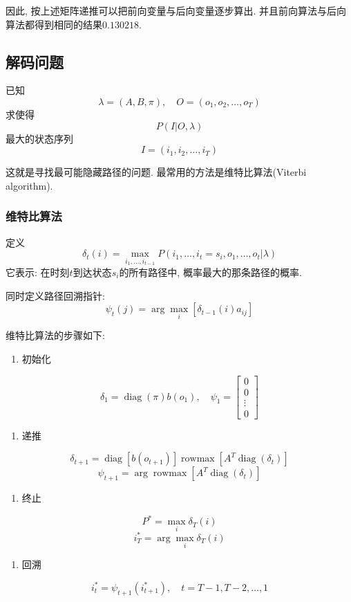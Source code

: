 因此, 按上述矩阵递推可以把前向变量与后向变量逐步算出.
并且前向算法与后向算法都得到相同的结果$0.130218$.

\subsection{解码问题}


已知
\[
\lambda = (A, B, \pi), \quad O = (o_1, o_2, \dots, o_T)
\]
求使得
\[
P(I | O, \lambda)
\]
最大的状态序列
\[
I = (i_1, i_2, \dots, i_T)
\]

这就是寻找最可能隐藏路径的问题.
最常用的方法是维特比算法(Viterbi algorithm).

\subsubsection{维特比算法}


定义
\[
\delta_t (i) = \max_{i_1, \dots, i_{t-1}} P(i_1, \dots, i_t = s_i, o_1, \dots, o_t | \lambda)
\]
它表示: 在时刻$t$到达状态$s_i$的所有路径中, 概率最大的那条路径的概率.

同时定义路径回溯指针:
\[
\psi_t(j) = \arg \max_i [\delta_{t-1}(i) a_{i j}]
\]

维特比算法的步骤如下:

\begin{enumerate}
\item[1.] 初始化
\end{enumerate}
\[
\delta_1 = \operatorname{diag}(\pi) b(o_1), \quad \psi_1 = \begin{bmatrix}0 \\ 0 \\ \vdots \\ 0\end{bmatrix}
\]

\begin{enumerate}
\item[2.] 递推
\end{enumerate}
\[
\delta_{t+1} = \operatorname{diag}[b(o_{t+1})]\operatorname{rowmax} [A^T \operatorname{diag}(\delta_t)]
\]
\[
\psi_{t+1} = \arg \operatorname{rowmax} [A^T \operatorname{diag}(\delta_t)]
\]

\begin{enumerate}
\item[3.] 终止
\end{enumerate}
\[
P^* = \max_i \delta_T (i)
\]
\[
i_T^* = \arg \max_i \delta_T (i)
\]

\begin{enumerate}
\item[4.] 回溯
\end{enumerate}
\[
i_t^* = \psi_{t+1}(i_{t+1}^*), \quad t = T-1, T-2, \dots, 1
\]

